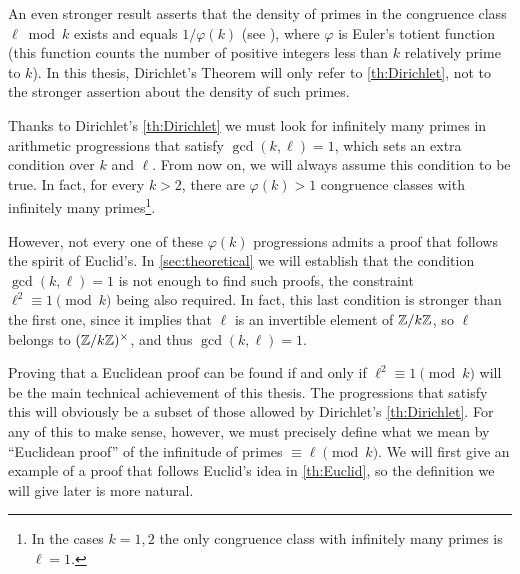 \documentclass[../main.tex]{subfiles}
\begin{document}
\begin{remark}
	An even stronger result asserts that the density of primes in the congruence class $\ell \bmod{k}$ exists and equals $1/\varphi(k)$ (see \cite{StrongDirichlet}), where $\varphi$ is Euler's totient function (this function counts the number of positive integers less than $k$ relatively prime to $k$). In this thesis, Dirichlet's Theorem will only refer to \cref{th:Dirichlet}, not to the stronger assertion about the density of such primes.
\end{remark}	

Thanks to Dirichlet's \cref{th:Dirichlet} we must look for infinitely many primes in arithmetic progressions that satisfy $\gcd(k, \ell)=1$, which sets an extra condition over $k$ and $\ell$. From now on, we will always assume this condition to be true. In fact, for every $k>2$, there are $\varphi(k)>1$ congruence classes with infinitely many primes\footnote{In the cases $k=1,2$ the only congruence class with infinitely many primes is $\ell=1$.}.

However, not every one of these $\varphi(k)$ progressions admits a proof that follows the spirit of Euclid's. In \cref{sec:theoretical} we will establish that the condition $\gcd(k,\ell)=1$ is not enough to find such proofs, the constraint $\ell^2\equiv 1 \pmod{k}$ being also required. In fact, this last condition is stronger than the first one, since it implies that $\ell$ is an invertible element of $\mathbb{Z}/k\mathbb{Z}$, so $\ell$ belongs to $(\mathbb{Z}/k\mathbb{Z})^\times$, and thus $\gcd(k,\ell)=1$.

Proving that a Euclidean proof can be found if and only if $\ell^2\equiv 1 \pmod{k}$ will be the main technical achievement of this thesis. The progressions that satisfy this will obviously be a subset of those allowed by Dirichlet's \cref{th:Dirichlet}. For any of this to make sense, however, we must precisely define what we mean by ``Euclidean proof'' of the infinitude of primes $\equiv \ell\pmod{k}$. We will first give an example of a proof that follows Euclid's idea in \cref{th:Euclid}, so the definition we will give later is more natural. 
\end{document}
